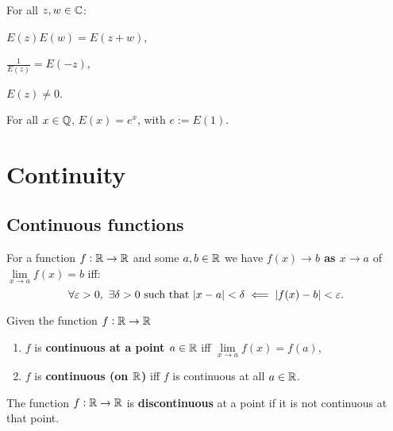 \documentclass[../Year1.tex]{subfiles}
\begin{document}
\begin{theorem}
    For all $z,w \in \mathbb{C}$: \\ \begin{enumerate*}
        \item $E(z)E(w)=E(z+w)$,
        \item $\displaystyle\frac{1}{E(z)}=E(-z)$,
        \item $E(z)\neq0$.
    \end{enumerate*}
\end{theorem}

\begin{theorem}
    For all $x\in\mathbb{Q}$, $E(x)=e^x$, with $e:=E(1)$.
\end{theorem}

\section{Continuity}

\subsection{Continuous functions}
\begin{definition}
    For a function $f:\mathbb{R}\rightarrow\mathbb{R}$ and some $a,b\in\mathbb{R}$ we have \textbf{$f(x)\rightarrow b$ as $x\rightarrow a$} of \textbf{$\lim\limits_{x\rightarrow a}f(x)=b$} iff: \[
        \forall\epsilon>0, \ \exists\delta>0 \ \text{\textcolor{black}{such that }} |x-a|<\delta \impliedby |f(x)-b|<\epsilon
        \textcolor{black}{.}
    \]
\end{definition}

\begin{definition}
    Given the function $f:\mathbb{R}\rightarrow\mathbb{R}$\begin{enumerate}
        \item $f$ is \textbf{continuous at a point $a\in\mathbb{R}$} iff $\lim\limits_{x\rightarrow a}f(x) = f(a)$,
        \item $f$ is \textbf{continuous (on $\mathbb{R}$)} iff $f$ is continuous at all $a\in\mathbb{R}$.
    \end{enumerate}
\end{definition}

\begin{definition}
    The function $f:\mathbb{R}\rightarrow\mathbb{R}$ is \textbf{discontinuous} at a point if it is not continuous at that point.
\end{definition}
\end{document}

